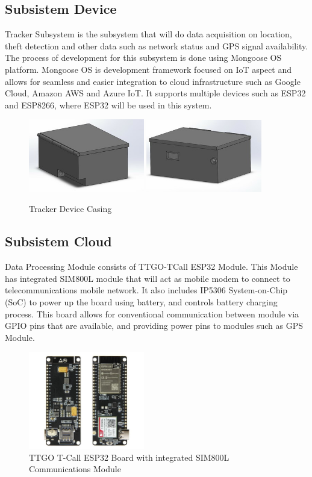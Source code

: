 \documentclass[conference]{IEEEtran}
\begin{document}
\subsection{Subsistem Device}
Tracker Subsystem is the subsystem that will do data acquisition on location, theft detection and other data such as network status and GPS signal availability. The process of development for this subsystem is done using Mongoose OS platform. Mongoose OS is development framework focused on IoT aspect and allows for seamless and easier integration to cloud infrastructure such as Google Cloud, Amazon AWS and Azure IoT. It supports multiple devices such as ESP32 and ESP8266, where ESP32 will be used in this system.
\begin{figure}[htbp]
    \centering
    \includegraphics[width=0.45\textwidth]{casing1}
    \includegraphics[width=0.45\textwidth]{casing2}
    \caption{Tracker Device Casing}
    \label{fig2}
\end{figure}

\subsection{Subsistem Cloud}
Data Processing Module consists of TTGO-TCall ESP32 Module. This Module has integrated SIM800L module that will act as mobile modem to connect to telecommunications mobile network. It also includes IP5306 System-on-Chip (SoC) to power up the board using battery, and controls battery charging process. This board allows for conventional communication between module via GPIO pins that are available, and providing power pins to modules such as GPS Module.

\begin{figure}[htbp]
    \centering
    \includegraphics[width=0.45\textwidth]{gambaresp32}
    \caption{TTGO T-Call ESP32 Board with integrated SIM800L Communications Module}
    \label{fig3}
\end{figure}
\end{document}
